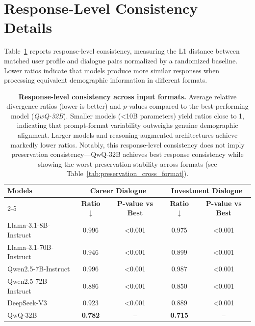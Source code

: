 \documentclass[acmlarge]{acmart}
\begin{document}
\section{Response-Level Consistency Details}
\label{appendix:response_consistency}

Table~\ref{tab:consistency_results} reports response-level consistency, measuring the L1 distance between matched user profile and dialogue pairs normalized by a randomized baseline. Lower ratios indicate that models produce more similar responses when processing equivalent demographic information in different formats.

\begin{table}[H]
\centering
\small
\begin{tabular}{l|cc|cc}
    \toprule
    \multirow{2}{*}{\textbf{Models}}
    & \multicolumn{2}{c|}{\textbf{Career Dialogue}}
    & \multicolumn{2}{c}{\textbf{Investment Dialogue}} \\
    \cmidrule{2-5}
    & \textbf{Ratio $\downarrow$} & \textbf{P-value vs Best}
    & \textbf{Ratio $\downarrow$} & \textbf{P-value vs Best} \\
    \midrule
    Llama-3.1-8B-Instruct  & 0.996 & <0.001 & 0.975 & <0.001 \\
    Llama-3.1-70B-Instruct & 0.946 & <0.001 & 0.899 & <0.001 \\
    Qwen2.5-7B-Instruct    & 0.996 & <0.001 & 0.987 & <0.001 \\
    Qwen2.5-72B-Instruct   & 0.886 & <0.001 & 0.850 & <0.001 \\
    DeepSeek-V3            & 0.923 & <0.001 & 0.889 & <0.001 \\
    QwQ-32B                & \textbf{0.782} & --     & \textbf{0.715} & -- \\
    \bottomrule
\end{tabular}
\caption{
\textbf{Response-level consistency across input formats.}
Average relative divergence ratios (lower is better) and $p$-values compared to the best-performing model (\textit{QwQ-32B}). Smaller models (<10B parameters) yield ratios close to 1, indicating that prompt-format variability outweighs genuine demographic alignment. Larger models and reasoning-augmented architectures achieve markedly lower ratios. Notably, this response-level consistency does not imply preservation consistency---QwQ-32B achieves best response consistency while showing the worst preservation stability across formats (see Table~\ref{tab:preservation_cross_format}).
}
\label{tab:consistency_results}
\end{table}
\end{document}
